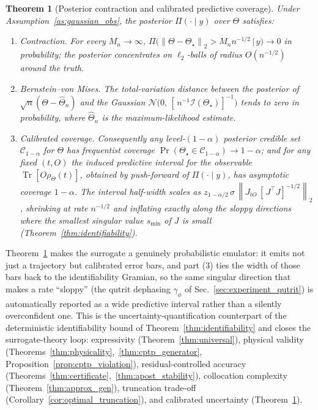 \documentclass[twocolumn,aps,prxquantum,superscriptaddress,nofootinbib,floatfix,longbibliography]{revtex4-2}
\newtheorem{theorem}{Theorem}
\DeclareMathOperator{\Tr}{Tr}
\newcommand{\norm}[1]{\left\lVert #1 \right\rVert}
\newcommand{\Thetahat}{\widehat{\Theta}}
\begin{document}
\begin{theorem}[Posterior contraction and calibrated predictive coverage]
\label{thm:uq_coverage}
Under Assumption~\ref{as:gaussian_obs}, the posterior $\Pi(\cdot\mid y)$ over $\Theta$ satisfies:
\begin{enumerate}[leftmargin=1.6em]
\item \emph{Contraction.} For every $M_n\to\infty$, $\Pi\big(\norm{\Theta-\Theta_\star}_2>M_n n^{-1/2}\,\big|\,y\big)\to0$ in probability; the posterior concentrates on $\ell_2$-balls of radius $O(n^{-1/2})$ around the truth.
\item \emph{Bernstein--von Mises.} The total-variation distance between the posterior of $\sqrt{n}(\Theta-\Thetahat_n)$ and the Gaussian $\mathcal{N}\!\big(0,\,[\,n^{-1}\mathcal{I}(\Theta_\star)]^{-1}\big)$ tends to zero in probability, where $\Thetahat_n$ is the maximum-likelihood estimate.
\item \emph{Calibrated coverage.} Consequently any level-$(1-\alpha)$ posterior credible set $\mathcal{C}_{1-\alpha}$ for $\Theta$ has frequentist coverage $\Pr(\Theta_\star\in\mathcal{C}_{1-\alpha})\to1-\alpha$; and for any fixed $(t,O)$ the induced predictive interval for the observable $\Tr[O\rho_\Theta(t)]$, obtained by push-forward of $\Pi(\cdot\mid y)$, has asymptotic coverage $1-\alpha$. The interval half-width scales as $z_{1-\alpha/2}\,\sigma\,\norm{J_{tO}\,[\,J^\top J]^{-1/2}}_2$, shrinking at rate $n^{-1/2}$ and inflating exactly along the sloppy directions where the smallest singular value $s_{\min}$ of $J$ is small (Theorem~\ref{thm:identifiability}).
\end{enumerate}
\end{theorem}

Theorem~\ref{thm:uq_coverage} makes the surrogate a genuinely probabilistic emulator: it emits not just a trajectory but calibrated error bars, and part (3) ties the width of those bars back to the identifiability Gramian, so the same singular direction that makes a rate ``sloppy'' (the qutrit dephasing $\gamma_\phi$ of Sec.~\ref{sec:experiment_qutrit}) is automatically reported as a wide predictive interval rather than a silently overconfident one. This is the uncertainty-quantification counterpart of the deterministic identifiability bound of Theorem~\ref{thm:identifiability} and closes the surrogate-theory loop: expressivity (Theorem~\ref{thm:universal}), physical validity (Theorems~\ref{thm:physicality},~\ref{thm:cptp_generator}, Proposition~\ref{prop:cptp_violation}), residual-controlled accuracy (Theorems~\ref{thm:certificate},~\ref{thm:apost_stability}), collocation complexity (Theorem~\ref{thm:approx_gen}), truncation trade-off (Corollary~\ref{cor:optimal_truncation}), and calibrated uncertainty (Theorem~\ref{thm:uq_coverage}).
\end{document}
